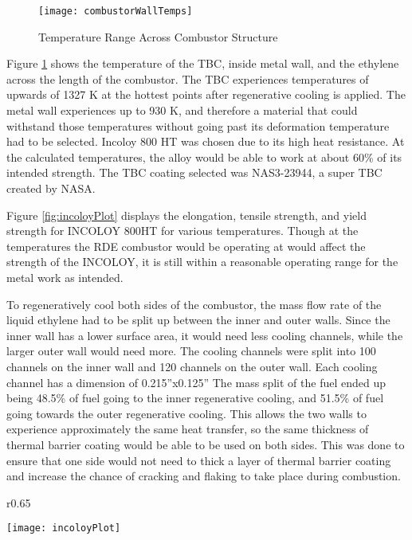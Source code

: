 \begin{figure}[H]
\begin{center}
\texttt{[image: combustorWallTemps]}
\caption{Temperature Range Across Combustor Structure}
\label{fig:combustorWallTemps}
\end{center}
\end{figure}

Figure \ref{fig:combustorWallTemps} shows the temperature of the TBC, inside metal wall, and the ethylene across the length of the combustor. The TBC experiences temperatures of upwards of 1327 K at the hottest points after regenerative cooling is applied. The metal wall experiences up to 930 K, and therefore a material that could withstand those temperatures without going past its deformation temperature had to be selected. Incoloy 800 HT was chosen due to its high heat resistance. At the calculated temperatures, the alloy would be able to work at about 60\% of its intended strength. The TBC coating selected was NAS3-23944, a super TBC created by NASA.

Figure \ref{fig:incoloyPlot} displays the elongation, tensile strength, and yield strength for INCOLOY 800HT for various temperatures. Though at the temperatures the RDE combustor would be operating at would affect the strength of the INCOLOY, it is still within a reasonable operating range for the metal work as intended.


To regeneratively cool both sides of the combustor, the mass flow rate of the liquid ethylene had to be split up between the inner and outer walls. Since the inner wall has a lower surface area, it would need less cooling channels, while the larger outer wall would need more. The cooling channels were split into 100 channels on the inner wall and 120 channels on the outer wall. Each cooling channel has a dimension of 0.215”x0.125” The mass split of the fuel ended up being 48.5\% of fuel going to the inner regenerative cooling, and 51.5\% of fuel going towards the outer regenerative cooling.  This allows the two walls to experience approximately the same heat transfer, so the same thickness of thermal barrier coating would be able to be used on both sides. This was done to ensure that one side would not need to thick a layer of thermal barrier coating and increase the chance of cracking and flaking to take place during combustion.

\begin{wrapfigure}{r}{0.65\textwidth}
\begin{center}
\texttt{[image: incoloyPlot]}
\caption{Temperature Range Across Combustor Structure \cite{inco}}
\label{fig:incoloyPlot}
\end{center}
\end{wrapfigure}